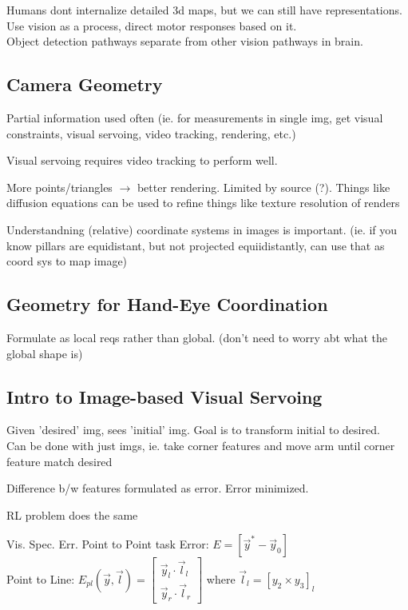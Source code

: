 \documentclass{article}
\begin{document}
Humans dont internalize detailed 3d maps, but we can still have representations. 
Use vision as a process, direct motor responses based on it. \\
Object detection pathways separate from other vision pathways in brain.

\subsection{Camera Geometry}
Partial information used often (ie. for measurements in single img, get visual constraints, visual servoing, video tracking, rendering, etc.)
\begin{list}{}{spacing}
  \item Visual servoing requires video tracking to perform well.
  \item More points/triangles $\rightarrow$ better rendering. Limited by source (?). Things like diffusion equations can be used to refine things like texture resolution of renders
\end{list}
Understandning (relative) coordinate systems in images is important. (ie. if you know pillars are equidistant, but not projected equiidistantly, can use that as coord sys to map image)

\subsection{Geometry for Hand-Eye Coordination}
Formulate as local reqs rather than global. (don't need to worry abt what the global shape is)

\subsection{Intro to Image-based Visual Servoing}
Given 'desired' img, sees 'initial' img. Goal is to transform initial to desired.\\[5pt]
Can be done with just imgs, ie. take corner features and move arm until corner feature match desired
\begin{list}{}{spacing}
  \item Difference b/w features formulated as error. Error minimized.
  \item RL problem does the same
\end{list}
\begin{expln}{Vis. Spec. Err.}{}
  Point to Point task Error: $E = [\vec y ^* -\vec y _0]$\\
  Point to Line: $E_{pl}(\vec y, \vec l) = \begin{bmatrix}
    \vec y_l \cdot \vec l _l \\ \vec y_r \cdot \vec l_r
  \end{bmatrix}$ where $\vec l_l = [y_2 \times y_3]_l$
\end{expln}
\end{document}
